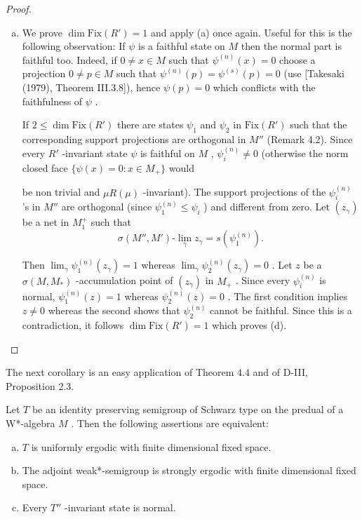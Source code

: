 \begin{proof}
\begin{enumerate}[(a)]
\item
We prove $ \dim \text{Fix}(R') = 1 $  and apply (a) once again.
Useful for this is the following observation: If $ \psi $  is a faithful state on $ M $  then the normal part is faithful too.
Indeed, if $ 0 \neq x \in M $  such that $ \psi^{(n)}(x) = 0 $  choose a projection $ 0 \neq p \in M $  such that $ \psi^{(n)}(p) = \psi^{(s)}(p) = 0 $  (use [Takesaki (1979), Theorem III.3.8]), hence $ \psi(p) = 0 $  which conflicts with the faithfulness of $ \psi $ .

If $ 2 \leq \dim \text{Fix}(R') $  there are states $ \psi_{1} $  and $ \psi_{2} $  in $ \text{Fix}(R') $  such that the corresponding support projections are orthogonal in $ M'' $  (Remark 4.2).
Since every $ R' $ -invariant state $ \psi $  is faithful on $ M $ , $ \psi_{i}^{(n)} \neq 0 $  (otherwise the norm closed face $ \{\psi(x) = 0: x \in M_{+}\} $  would

\newpage

be non trivial and $ \mu R(\mu) $ -invariant).
The support projections of the $ \psi_{i}^{(n)} $ 's in $ M'' $  are orthogonal (since $ \psi_{1}^{(n)} \leq \psi_{i} $ ) and different from zero.
Let $ (z_{\gamma}) $  be a net in $ M_{1}^{+} $  such that
\[
\sigma(M'',M')\text{-}\lim_{\gamma} z_{\gamma} = s(\psi_{1}^{(n)}).
\]

Then $ \lim_{\gamma} \psi_{1}^{(n)}(z_{\gamma}) = 1 $  whereas $ \lim_{\gamma} \psi_{2}^{(n)}(z_{\gamma}) = 0 $ .
Let $ z $  be a $ \sigma(M,M_{*}) $ -accumulation point of $ (z_{\gamma}) $  in $ M_{+} $ .
Since every $ \psi_{i}^{(n)} $  is normal, $ \psi_{1}^{(n)}(z) = 1 $  whereas $ \psi_{2}^{(n)}(z) = 0 $ .
The first condition implies $ z \neq 0 $  whereas the second shows that $ \psi_{2}^{(n)} $  cannot be faithful.
Since this is a contradiction, it follows $ \dim \text{Fix}(R') = 1 $  which proves (d).
\end{enumerate}
\end{proof}

The next corollary is an easy application of Theorem 4.4 and of D-III, Proposition 2.3.

\begin{corollary}\label{cor:d4-4.5}
Let $ T $  be an identity preserving semigroup of Schwarz type on the predual of a W*-algebra $ M $ .
Then the following assertions are equivalent:

\begin{enumerate}[(a)]
\item
$ T $  is uniformly ergodic with finite dimensional fixed space.

\item
The adjoint weak*-semigroup is strongly ergodic with finite dimensional fixed space.

\item
Every $ T'' $ -invariant state is normal.
\end{enumerate}
\end{corollary}


